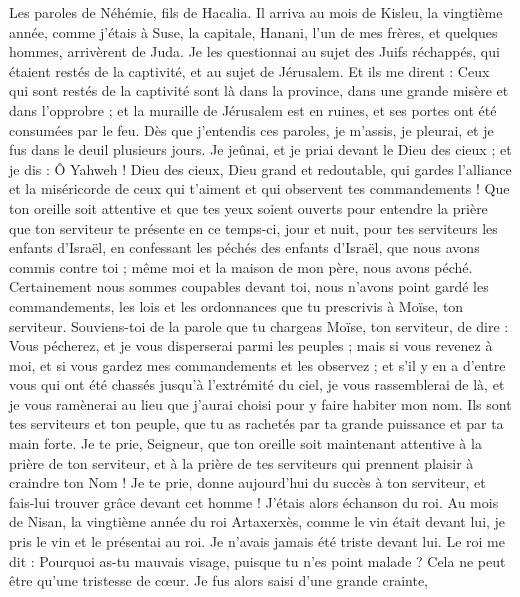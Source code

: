 \BFont
\begin{multicols}{2}
\VerseOne{}Les paroles de Néhémie, fils de Hacalia. Il arriva au mois de Kisleu, la vingtième année, comme j'étais à Suse, la capitale,
Hanani, l'un de mes frères, et quelques hommes, arrivèrent de Juda. Je les questionnai au sujet des Juifs réchappés, qui étaient restés de la captivité, et au sujet de Jérusalem.
Et ils me dirent : Ceux qui sont restés de la captivité sont là dans la province, dans une grande misère et dans l’opprobre ; et la muraille de Jérusalem est en ruines, et ses portes ont été consumées par le feu.
Dès que j’entendis ces paroles, je m'assis, je pleurai, et je fus dans le deuil plusieurs jours. Je jeûnai, et je priai devant le Dieu des cieux ;
 et je dis : Ô Yahweh ! Dieu des cieux, Dieu grand et redoutable, qui gardes l'alliance et la miséricorde de ceux qui t'aiment et qui observent tes commandements !
Que ton oreille soit attentive et que tes yeux soient ouverts pour entendre la prière que ton serviteur te présente en ce temps-ci, jour et nuit, pour tes serviteurs les enfants d'Israël, en confessant les péchés des enfants d'Israël, que nous avons commis contre toi ; même moi et la maison de mon père, nous avons péché.
Certainement nous sommes coupables devant toi, nous n'avons point gardé les commandements, les lois et les ordonnances que tu prescrivis à Moïse, ton serviteur.
Souviens-toi de la parole que tu chargeas Moïse, ton serviteur, de dire : Vous pécherez, et je vous disperserai parmi les peuples ;
mais si vous revenez à moi, et si vous gardez mes commandements et les observez ; et s'il y en a d'entre vous qui ont été chassés jusqu'à l'extrémité du ciel, je vous rassemblerai de là, et je vous ramènerai au lieu que j'aurai choisi pour y faire habiter mon nom.
Ils sont tes serviteurs et ton peuple, que tu as rachetés par ta grande puissance et par ta main forte.
Je te prie, Seigneur, que ton oreille soit maintenant attentive à la prière de ton serviteur, et à la prière de tes serviteurs qui prennent plaisir à craindre ton Nom ! Je te prie, donne aujourd'hui du succès à ton serviteur, et fais-lui trouver grâce devant cet homme ! J'étais alors échanson du roi.
\VerseOne{}Au mois de Nisan, la vingtième année du roi Artaxerxès, comme le vin était devant lui, je pris le vin et le présentai au roi. Je n'avais jamais été triste devant lui.
Le roi me dit : Pourquoi as-tu mauvais visage, puisque tu n'es point malade ? Cela ne peut être qu’une tristesse de cœur. Je fus alors saisi d'une grande crainte,

\end{multicols}
